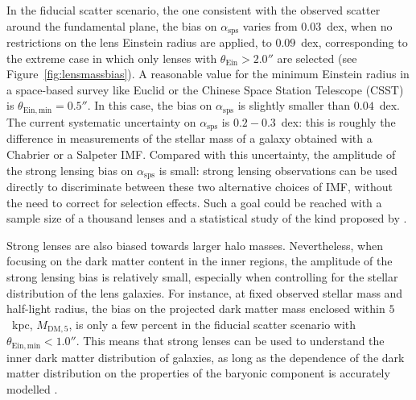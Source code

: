 \documentclass{aa}
\def\asps{\alpha_{\mathrm{sps}}}
\def\mdmfive{M_{\mathrm{DM}, 5}}
\def\tein{\theta_{\mathrm{Ein}}}
\def\Fref#1{Figure~\ref{#1}\xspace}
\begin{document}
In the fiducial scatter scenario, the one consistent with the observed scatter around the fundamental plane, the bias on $\asps$ varies from $0.03$~dex, when no restrictions on the lens Einstein radius are applied, to $0.09$~dex, corresponding to the extreme case in which only lenses with $\tein > 2.0''$ are selected (see \Fref{fig:lensmassbias}).
A reasonable value for the minimum Einstein radius in a space-based survey like Euclid or the Chinese Space Station Telescope (CSST) is $\theta_{\mathrm{Ein,min}}=0.5''$. In this case, the bias on $\asps$ is slightly smaller than $0.04$~dex.
The current systematic uncertainty on $\asps$ is $0.2-0.3$~dex: this is roughly the difference in measurements of the stellar mass of a galaxy obtained with a Chabrier or a Salpeter IMF.
Compared with this uncertainty, the amplitude of the strong lensing bias on $\asps$ is small: strong lensing observations can be used directly to discriminate between these two alternative choices of IMF, without the need to correct for selection effects. %
Such a goal could be reached with a sample size of a thousand lenses and a statistical study of the kind proposed by \citet{S+C21}.

Strong lenses are also biased towards larger halo masses.
Nevertheless, when focusing on the dark matter content in the inner regions, the amplitude of the strong lensing bias is relatively small, especially when controlling for the stellar distribution of the lens galaxies.
For instance, at fixed observed stellar mass and half-light radius, the bias on the projected dark matter mass enclosed within $5$~kpc, $\mdmfive$, is only a few percent in the fiducial scatter scenario with $\theta_{\mathrm{Ein,min}} < 1.0''$.
This means that strong lenses can be used to understand the inner dark matter distribution of galaxies, as long as the dependence of the dark matter distribution on the properties of the baryonic component is accurately modelled \citep[for example, by following the approach of][]{S+C21}.
\end{document}
